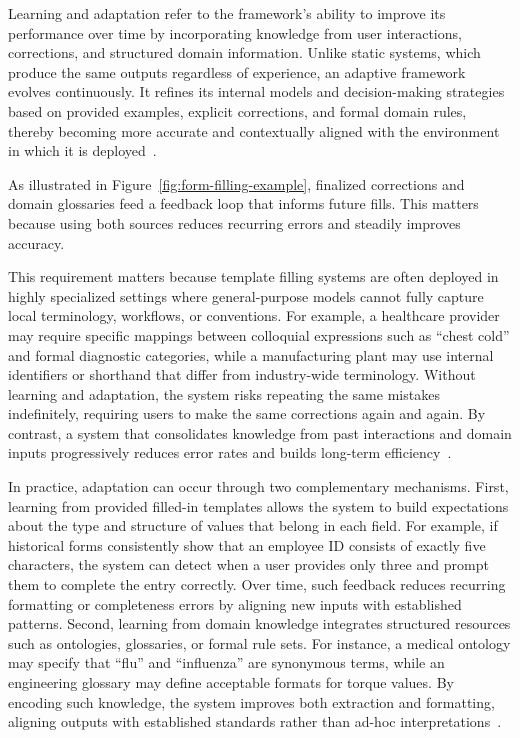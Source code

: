 Learning and adaptation refer to the framework’s ability to improve its performance over time by incorporating knowledge from user interactions, corrections, and structured domain information. Unlike static systems, which produce the same outputs regardless of experience, an adaptive framework evolves continuously. It refines its internal models and decision-making strategies based on provided examples, explicit corrections, and formal domain rules, thereby becoming more accurate and contextually aligned with the environment in which it is deployed~\cite{doshi2017towards, sun2023slot}.  

As illustrated in Figure~\ref{fig:form-filling-example}, finalized corrections and domain glossaries feed a feedback loop that informs future fills. This matters because using both sources reduces recurring errors and steadily improves accuracy.

This requirement matters because template filling systems are often deployed in highly specialized settings where general-purpose models cannot fully capture local terminology, workflows, or conventions. For example, a healthcare provider may require specific mappings between colloquial expressions such as “chest cold” and formal diagnostic categories, while a manufacturing plant may use internal identifiers or shorthand that differ from industry-wide terminology. Without learning and adaptation, the system risks repeating the same mistakes indefinitely, requiring users to make the same corrections again and again. By contrast, a system that consolidates knowledge from past interactions and domain inputs progressively reduces error rates and builds long-term efficiency~\cite{liu2022conversational, mialon2023augmented}.  

In practice, adaptation can occur through two complementary mechanisms. First, learning from provided filled-in templates allows the system to build expectations about the type and structure of values that belong in each field. For example, if historical forms consistently show that an employee ID consists of exactly five characters, the system can detect when a user provides only three and prompt them to complete the entry correctly. Over time, such feedback reduces recurring formatting or completeness errors by aligning new inputs with established patterns. Second, learning from domain knowledge integrates structured resources such as ontologies, glossaries, or formal rule sets. For instance, a medical ontology may specify that “flu” and “influenza” are synonymous terms, while an engineering glossary may define acceptable formats for torque values. By encoding such knowledge, the system improves both extraction and formatting, aligning outputs with established standards rather than ad-hoc interpretations~\cite{clark2020accessible, chen2024webforms}.

